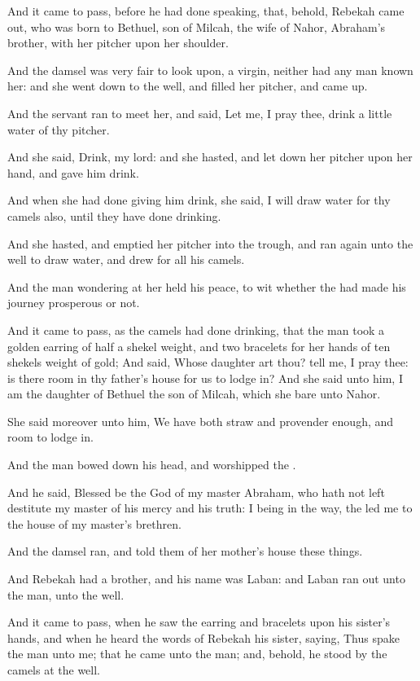 \verse And it came to pass, before he had done speaking, that, behold, Rebekah came out, who was born to Bethuel, son of Milcah, the wife of Nahor, Abraham's brother, with her pitcher upon her shoulder.

\verse And the damsel was very fair to look upon, a virgin, neither had any man known her: and she went down to the well, and filled her pitcher, and came up.

\verse And the servant ran to meet her, and said, Let me, I pray thee, drink a little water of thy pitcher.

\verse And she said, Drink, my lord: and she hasted, and let down her pitcher upon her hand, and gave him drink.

\verse And when she had done giving him drink, she said, I will draw water for thy camels also, until they have done drinking.

\verse And she hasted, and emptied her pitcher into the trough, and ran again unto the well to draw water, and drew for all his camels.

\verse And the man wondering at her held his peace, to wit whether the \LORD had made his journey prosperous or not.

\verse And it came to pass, as the camels had done drinking, that the man took a golden earring of half a shekel weight, and two bracelets for her hands of ten shekels weight of gold; \verse And said, Whose daughter art thou? tell me, I pray thee: is there room in thy father's house for us to lodge in?  \verse And she said unto him, I am the daughter of Bethuel the son of Milcah, which she bare unto Nahor.

\verse She said moreover unto him, We have both straw and provender enough, and room to lodge in.

\verse And the man bowed down his head, and worshipped the \LORD.

\verse And he said, Blessed be the \LORD God of my master Abraham, who hath not left destitute my master of his mercy and his truth: I being in the way, the \LORD led me to the house of my master's brethren.

\verse And the damsel ran, and told them of her mother's house these things.

\verse And Rebekah had a brother, and his name was Laban: and Laban ran out unto the man, unto the well.

\verse And it came to pass, when he saw the earring and bracelets upon his sister's hands, and when he heard the words of Rebekah his sister, saying, Thus spake the man unto me; that he came unto the man; and, behold, he stood by the camels at the well.

